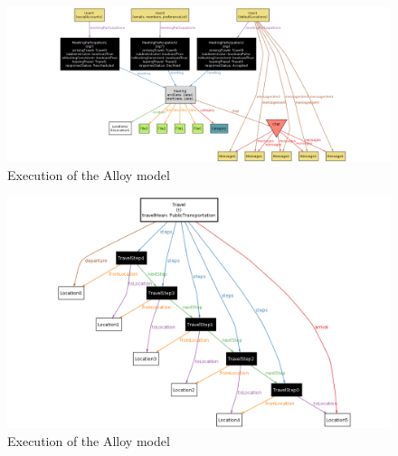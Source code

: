 \begin{figure}
	\hspace*{-4cm}
	\centering\includegraphics[scale=0.5]{Images/AlloyShowMeeting2.png}
	\caption{Execution of the Alloy model}
\end{figure}

\begin{figure}
	\hspace*{-2cm}
	\includegraphics[scale=0.5]{Images/AlloyShowTravel2.png}
	\caption{Execution of the Alloy model}
\end{figure}
